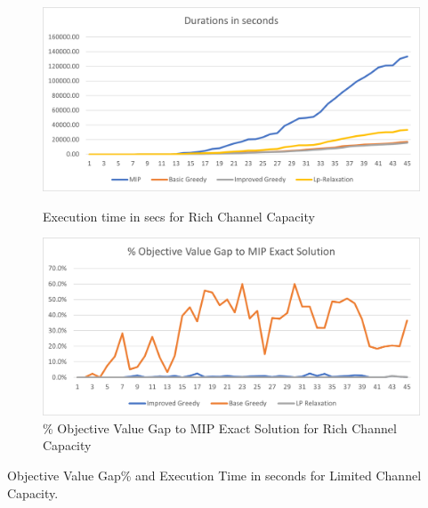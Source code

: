 \documentclass[11pt]{article}
\begin{document}
        \begin{figure}[htb!]
        \centering
        \begin{minipage}{.6\textwidth}
            \centering
            \includegraphics[width=.7\linewidth]{durations_exact_rich.png}
            \caption{Execution time in secs for Rich Channel Capacity}
            \label{fig:fig_durations_exact_rich}
        \end{minipage}%
        \begin{minipage}{.6\textwidth}
            \centering
            \includegraphics[width=.7\linewidth]{performance_exact_rich.png}
            \caption{\% Objective Value Gap to MIP Exact Solution for Rich Channel Capacity}
            \label{fig:fig_value_gap_exact_rich}
        \end{minipage}
        \end{figure}
        
        \begin{table}[htb!]
        \caption{Objective Value Gap\% and Execution Time in seconds for Limited Channel Capacity.}\label{table:tbl_exact_limited_results}
        \begin{adjustbox}{max width=1\textwidth}
        \end{adjustbox}
        \label{tab:test}
        \end{table}
\end{document}
